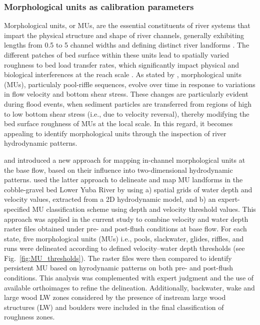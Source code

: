\documentclass[draft,linenumbers,onecolumn]{agujournal2019} %
\begin{document}
\subsubsection{Morphological units as calibration parameters}
\label{subsec:Sec2.5.1}
Morphological units, or MUs, are the essential constituents of river systems that impart the physical structure and shape of river channels, generally exhibiting lengths from 0.5 to 5 channel widths and defining distinct river landforms \cite{woodworth2022are}. The different patches of bed surface within these units lead to spatially varied roughness to bed load transfer rates, which significantly impact physical and biological interferences at the reach scale \cite{buffington1999effects,dietrich2005sediment}. As stated by , morphological units (MUs), particulaly pool-riffle sequences, evolve over time in response to variations in flow velocity and bottom shear stress. These changes are particularly evident during flood events, when sediment particles are transferred from regions of high to low bottom shear stress (i.e., due to velocity reversal), thereby modifying the bed surface roughness of MUs at the local scale. In this regard, it becomes appealing to identify morphological units through the inspection of river hydrodynamic patterns. 

 and  introduced a new approach for mapping in-channel morphological units at the base flow, based on their influence into two-dimensional hydrodynamic patterns.  used the latter approach to delineate and map MU landforms in the cobble-gravel bed Lower Yuba River by using a) spatial grids of water depth and velocity values, extracted from a 2D hydrodynamic model, and b) an expert-specified MU classification scheme using depth and velocity threshold values. This approach was applied in the current study to combine velocity and water depth raster files obtained under pre- and post-flush conditions at base flow. For each state, five morphological units (MUs) i.e., pools, slackwater, glides, riffles, and runs were delineated according to defined velocity–water depth thresholds (see Fig.~\ref{fig:MU_thresholds}). The raster files were then compared to identify persistent MU based on hyrodynamic patterns on both pre- and post-flush conditions. This analysis was complemented with expert judgment and the use of available orthoimages to refine the delineation. Additionally, backwater, wake and large wood LW zones considered by the presence of instream large wood structures (LW) and boulders were included in the final classification of roughness zones.    
\end{document}
